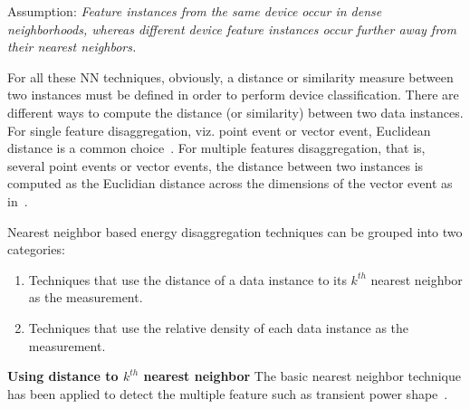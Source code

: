Assumption: \textit{Feature instances from the same device occur in dense neighborhoods, 
whereas different device feature instances occur further away from their nearest neighbors.}

For all these NN techniques, obviously, a distance or similarity measure between two instances 
must be defined in order to perform device classification. 
There are different ways to compute the distance (or similarity) between two data instances.
For single feature disaggregation, viz. point event or vector event, 
Euclidean distance is a common choice~\cite{gupta2010electrisense}.
For multiple features disaggregation, that is, several point events or vector events, 
the distance between two instances is computed as the Euclidian distance across the dimensions of the vector event as in~\cite{shaw2000PhdThesis}. 

Nearest neighbor based energy disaggregation techniques can be grouped into 
two categories: 
\begin{enumerate}
\item Techniques that use the distance of a data instance to its $k^{th}$ nearest neighbor 
as the measurement. 
\item Techniques that use the relative density of each data instance as the measurement. 
\end{enumerate}

\textbf{Using distance to $k^{th}$ nearest neighbor}
The basic nearest neighbor technique has been applied to detect the 
multiple feature such as transient power shape~\cite{shaw2000PhdThesis,lee2005estimation,berges2009learning,berges2010enhancing}.




